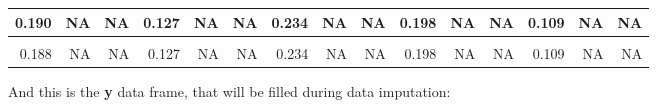 \documentclass[]{article}
\begin{document}
\begin{table}[H]
{\begin{tabular}[t]{r|r|r|r|r|r|r|r|r|r|r|r|r|r|r}
\hline
0.190 & NA & NA & 0.127 & NA & NA & 0.234 & NA & NA & 0.198 & NA & NA & 0.109 & NA & NA\\
\hline
\cellcolor{gray!6}{0.189} & \cellcolor{gray!6}{NA} & \cellcolor{gray!6}{NA} & \cellcolor{gray!6}{0.127} & \cellcolor{gray!6}{NA} & \cellcolor{gray!6}{NA} & \cellcolor{gray!6}{0.234} & \cellcolor{gray!6}{NA} & \cellcolor{gray!6}{NA} & \cellcolor{gray!6}{0.198} & \cellcolor{gray!6}{NA} & \cellcolor{gray!6}{NA} & \cellcolor{gray!6}{0.109} & \cellcolor{gray!6}{NA} & \cellcolor{gray!6}{NA}\\
\hline
0.188 & NA & NA & 0.127 & NA & NA & 0.234 & NA & NA & 0.198 & NA & NA & 0.109 & NA & NA\\
\hline
\end{tabular}}
\end{table}

And this is the \textbf{y} data frame, that will be filled during data
imputation:
\end{document}
